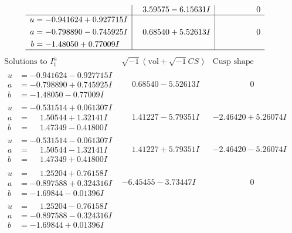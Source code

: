 \documentclass[1p]{elsarticle_modified}
\theoremstyle{definition}
\newcommand{\I}{\sqrt{-1}}
\begin{document}
$$\begin{array}{c|c|c}
 & \phantom{-}3.59575 - 6.15631 I & \phantom{-0.000000 } 0 \\ \hline\begin{aligned}
u &= -0.941624 + 0.927715 I \\
a &= -0.798890 - 0.745925 I \\
b &= -1.48050 + 0.77009 I\end{aligned}
 & \phantom{-}0.68540 + 5.52613 I & \phantom{-0.000000 } 0\\
 \hline 
 \end{array}$$\newpage$$\begin{array}{c|c|c}  
\text{Solutions to }I^u_{1}& \I (\text{vol} + \sqrt{-1}CS) & \text{Cusp shape}\\
 \hline 
\begin{aligned}
u &= -0.941624 - 0.927715 I \\
a &= -0.798890 + 0.745925 I \\
b &= -1.48050 - 0.77009 I\end{aligned}
 & \phantom{-}0.68540 - 5.52613 I & \phantom{-0.000000 } 0 \\ \hline\begin{aligned}
u &= -0.531514 + 0.061307 I \\
a &= \phantom{-}1.50544 + 1.32141 I \\
b &= \phantom{-}1.47349 - 0.41800 I\end{aligned}
 & \phantom{-}1.41227 - 5.79351 I & -2.46420 + 5.26074 I \\ \hline\begin{aligned}
u &= -0.531514 - 0.061307 I \\
a &= \phantom{-}1.50544 - 1.32141 I \\
b &= \phantom{-}1.47349 + 0.41800 I\end{aligned}
 & \phantom{-}1.41227 + 5.79351 I & -2.46420 - 5.26074 I \\ \hline\begin{aligned}
u &= \phantom{-}1.25204 + 0.76158 I \\
a &= -0.897588 + 0.324316 I \\
b &= -1.69844 - 0.01396 I\end{aligned}
 & -6.45455 - 3.73447 I & \phantom{-0.000000 } 0 \\ \hline\begin{aligned}
u &= \phantom{-}1.25204 - 0.76158 I \\
a &= -0.897588 - 0.324316 I \\
b &= -1.69844 + 0.01396 I\end{aligned}

\end{array}$$
\end{document}
